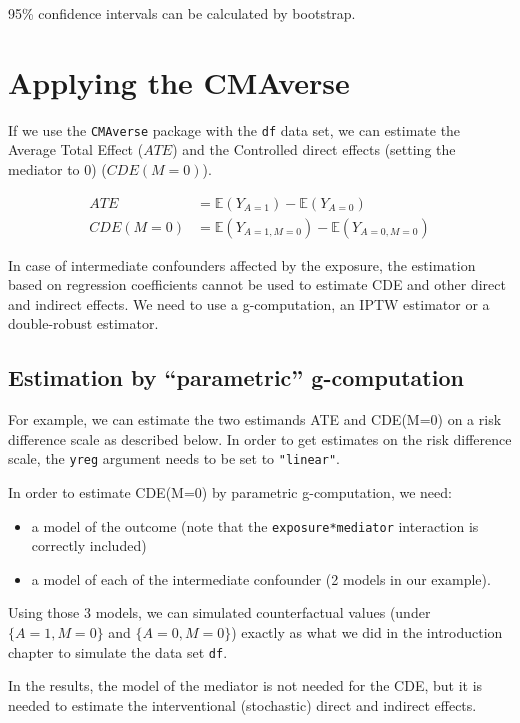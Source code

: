 \documentclass[
]{book}
\providecommand{\tightlist}{%
  \setlength{\itemsep}{0pt}\setlength{\parskip}{0pt}}
\begin{document}
95\% confidence intervals can be calculated by bootstrap.

\chapter{Applying the CMAverse}\label{applying-the-cmaverse}

If we use the \texttt{CMAverse} package with the \texttt{df} data set, we can estimate the Average Total Effect (\(ATE\)) and the Controlled direct effects (setting the mediator to 0) (\(CDE(M=0)\)).

\begin{align*}
ATE &= \mathbb{E}(Y_{A=1}) - \mathbb{E}(Y_{A=0}) \\
CDE(M=0) &= \mathbb{E}(Y_{A=1,M=0}) - \mathbb{E}(Y_{A=0,M=0}) 
\end{align*}

In case of intermediate confounders affected by the exposure, the estimation based on regression coefficients cannot be used to estimate CDE and other direct and indirect effects. We need to use a g-computation, an IPTW estimator or a double-robust estimator.

\section{Estimation by ``parametric'' g-computation}\label{estimation-by-parametric-g-computation}

For example, we can estimate the two estimands ATE and CDE(M=0) on a risk difference scale as described below. In order to get estimates on the risk difference scale, the \texttt{yreg} argument needs to be set to \texttt{"linear"}.

In order to estimate CDE(M=0) by parametric g-computation, we need:

\begin{itemize}
\tightlist
\item
  a model of the outcome (note that the \texttt{exposure*mediator} interaction is correctly included)
\item
  a model of each of the intermediate confounder (2 models in our example).
\end{itemize}

Using those 3 models, we can simulated counterfactual values (under \(\{A=1,M=0\}\) and \(\{A=0,M=0\}\)) exactly as what we did in the introduction chapter to simulate the data set \texttt{df}.

In the results, the model of the mediator is not needed for the CDE, but it is needed to estimate the interventional (stochastic) direct and indirect effects.
\end{document}
